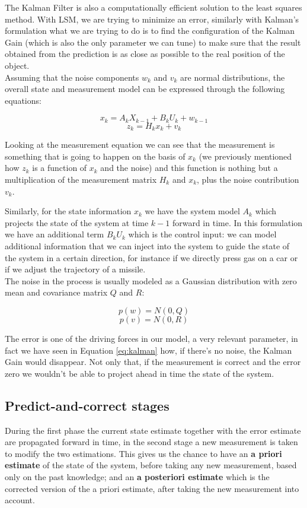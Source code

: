 The Kalman Filter is also a computationally efficient solution to the least squares method. With LSM, we are trying to minimize an error, similarly with Kalman's formulation what we are trying to do is to find the configuration of the Kalman Gain (which is also the only parameter we can tune) to make sure that the result obtained from the prediction is as close as possible to the real position of the object.
\\

Assuming that the noise components $w_k$ and $v_k$ are normal distributions, the overall state and measurement model can be expressed through the following equations:

\[
    x_k = A_kX_{k-1}+B_kU_k+w_{k-1}    
\]
\[
    z_k = H_kx_k+v_k   
\]

Looking at the measurement equation we can see that the measurement is something that is going to happen on the basis of $x_k$ (we previously mentioned how $z_k$ is a function of $x_k$ and the noise) and this function is nothing but a multiplication of the measurement matrix $H_k$ and $x_k$, plus the noise contribution $v_k$.

Similarly, for the state information $x_k$ we have the system model $A_k$ which projects the state of the system at time $k-1$ forward in time. In this formulation we have an additional term $B_kU_k$ which is the control input: we can model additional information that we can inject into the system to guide the state of the system in a certain direction, for instance if we directly press gas on a car or if we adjust the trajectory of a missile.
\\

The noise in the process is usually modeled as a Gaussian distribution with zero mean and covariance matrix $Q$ and $R$:

\[
    p(w) = N(0, Q)
\]
\[
    p(v) = N(0, R)
\]

The error is one of the driving forces in our model, a very relevant parameter, in fact we have seen in Equation \ref{eq:kalman} how, if there's no noise, the Kalman Gain would disappear. Not only that, if the measurement is correct and the error zero we wouldn't be able to project ahead in time the state of the system.

\subsection{Predict-and-correct stages}

During the first phase the current state estimate together with the error estimate are propagated forward in time, in the second stage a new measurement is taken to modify the two estimations.
This gives us the chance to have an \textbf{a priori estimate} of the state of the system, before taking any new measurement, based only on the past knowledge; and an \textbf{a posteriori estimate} which is the corrected version of the a priori estimate, after taking the new measurement into account.
\\

